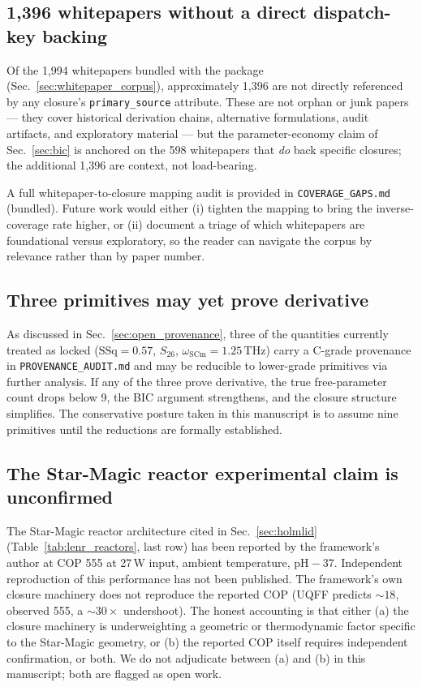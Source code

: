 \subsection{1{,}396 whitepapers without a direct dispatch-key backing}
\label{sec:lim_orphan_whitepapers}

Of the 1{,}994 whitepapers bundled with the package
(Sec.~\ref{sec:whitepaper_corpus}), approximately 1{,}396 are not
directly referenced by any closure's \texttt{primary\_source}
attribute. These are not orphan or junk papers --- they cover
historical derivation chains, alternative formulations, audit
artifacts, and exploratory material --- but the parameter-economy
claim of Sec.~\ref{sec:bic} is anchored on the 598 whitepapers
that \emph{do} back specific closures; the additional 1{,}396 are
context, not load-bearing.

A full whitepaper-to-closure mapping audit is provided in
\texttt{COVERAGE\_GAPS.md} (bundled). Future work would either
(i) tighten the mapping to bring the inverse-coverage rate higher,
or (ii) document a triage of which whitepapers are
foundational versus exploratory, so the reader can navigate the
corpus by relevance rather than by paper number.

\subsection{Three primitives may yet prove derivative}
\label{sec:lim_primitives}

As discussed in Sec.~\ref{sec:open_provenance}, three of the
quantities currently treated as locked
($\mathrm{SSq} = 0.57$, $S_{26}$, $\omega_{\text{SCm}} = 1.25\,\mathrm{THz}$)
carry a C-grade provenance in
\texttt{PROVENANCE\_AUDIT.md} and may be reducible to lower-grade
primitives via further analysis. If any of the three prove
derivative, the true free-parameter count drops below 9, the BIC
argument strengthens, and the closure structure simplifies. The
conservative posture taken in this manuscript is to assume nine
primitives until the reductions are formally established.

\subsection{The Star-Magic reactor experimental claim is unconfirmed}
\label{sec:lim_star_magic}

The Star-Magic reactor architecture cited in Sec.~\ref{sec:holmlid}
(Table~\ref{tab:lenr_reactors}, last row) has been reported by the
framework's author at COP 555 at 27\,W input, ambient temperature,
$\mathrm{pH}-37$. Independent reproduction of this performance has
not been published. The framework's own closure machinery does not
reproduce the reported COP (UQFF predicts $\sim 18$, observed 555,
a $\sim 30 \times$ undershoot). The honest accounting is that
either (a) the closure machinery is underweighting a geometric or
thermodynamic factor specific to the Star-Magic geometry, or
(b) the reported COP itself requires independent confirmation, or
both. We do not adjudicate between (a) and (b) in this manuscript;
both are flagged as open work.

